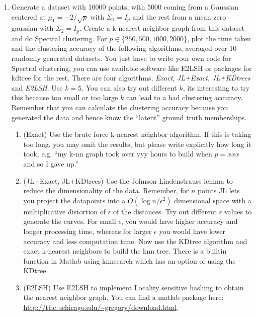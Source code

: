 \documentclass[11pt]{article}
\begin{document}
\begin{enumerate}

\begin{enumerate}
	\item Generate a dataset with 10000 points, with 5000 coming from a Gaussian centered at $\mu_1=-2/\sqrt{p}$ with $\Sigma_1=I_p$ and the rest from a mean zero gaussian with $\Sigma_2=I_p$. Create a k-nearest neighbor graph from this dataset and do Spectral clustering. For $p\in\{250,500,1000,2000\}$, plot the time taken and the clustering accuracy of the following algorithms, averaged over 10 randomly generated datasets. You just have to write your own code for Spectral clustering, you can use available software like E2LSH or packages for kdtree for the rest. There are four algorithms, \textit{Exact}, \textit{JL+Exact}, \textit{JL+KDtrees} and \textit{E2LSH}. Use $k=5$. You can also try out different $k$, its interesting to try this because too small or too large $k$ can lead to a bad clustering accuracy. Remember that you can calculate the clustering accuracy because you generated the data and hence know the ``latent'' ground truth memberships.
\begin{enumerate}
	\item (Exact) Use the brute force k-nearest neighbor algorithm. If this is taking too long, you may omit the results, but please write explicitly how long it took, e.g. ``my k-nn graph took over yyy hours to build when $p=xxx$ and so I gave up.''
	\item (JL+Exact, JL+KDtrees) Use the Johnson Lindenstrauss lemma to reduce the dimensionality of the data. Remember, for $n$ points JL lets you project the datapoints into a $O(\log n/\epsilon^2)$ dimensional space with a multiplicative distortion of $\epsilon$ of the distances. Try out different $\epsilon$ values to generate the curves. For small $\epsilon$, you would have higher accuracy and longer processing time, whereas for larger $\epsilon$ you would have lower accuracy and less computation time. Now use the KDtree algorithm and exact k-nearest neighbors to build the knn tree. There is a builtin function in Matlab using knnsearch which has an option of using the KDtree.
	\item (E2LSH) Use E2LSH to implement Locality sensitive hashing to obtain the nearest neighbor graph. You can find a matlab package here:
	\url{http://ttic.uchicago.edu/~gregory/download.html}.
	\end{enumerate}
\end{enumerate}

\end{enumerate}
\end{document}

